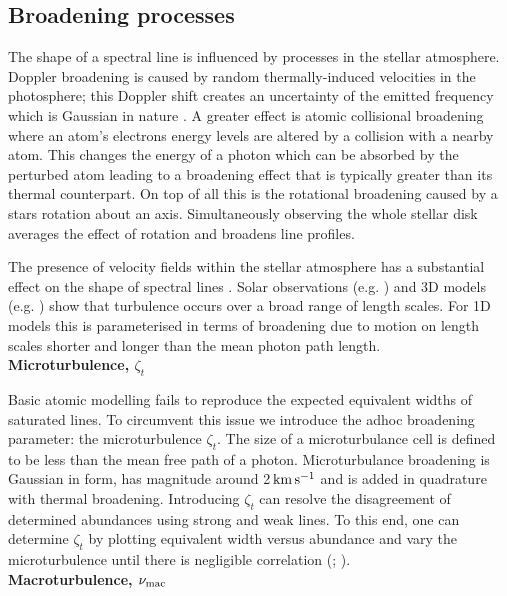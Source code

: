 \subsection{Broadening processes}

The shape of a spectral line is influenced by processes in the stellar atmosphere. Doppler broadening is caused by random thermally-induced velocities in the photosphere; this Doppler shift creates an uncertainty of the emitted frequency which is Gaussian in nature \citep{2008oasp.book.....G}. A greater effect is atomic collisional broadening where an atom’s electrons energy levels are altered by a collision with a nearby atom. This changes the energy of a photon which can be absorbed by the perturbed atom leading to a broadening effect that is typically greater than its thermal counterpart. On top of all this is the rotational broadening caused by a stars rotation about an axis. Simultaneously observing the whole stellar disk averages the effect of rotation and broadens line profiles.

The presence of velocity fields within the stellar atmosphere has a substantial effect on the shape of spectral lines \citep{Doyle2015}. Solar observations (e.g. \citealt{2009LRSP....6....2N}) and 3D models (e.g. \citealt{2011SoPh..268..255C}) show that turbulence occurs over a broad range of length scales. For 1D models this is parameterised in terms of broadening due to motion on length scales shorter and longer than the mean photon path length. \\

\noindent \textbf{Microturbulence, $\zeta_t$}

Basic atomic modelling fails to reproduce the expected equivalent widths of saturated lines. To circumvent this issue we introduce the adhoc broadening parameter: the microturbulence $\zeta_t$. The size of a microturbulance cell is defined to be less than the mean free path of a photon. Microturbulance broadening is Gaussian in form, has magnitude around 2$\, \rm km\, \rm s^{-1}$ and is added in quadrature with thermal broadening. Introducing $\zeta_t$ can resolve the disagreement of determined abundances using strong and weak lines. To this end, one can determine $\zeta_t$ by plotting equivalent width versus abundance and vary the microturbulence until there is negligible correlation (\citealt{Doyle2015}; \citealt{1984A&A...134..189M}). \\

\noindent \textbf{Macroturbulence, $\nu_{\rm mac}$}

